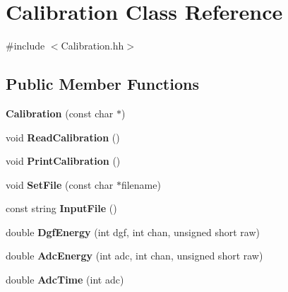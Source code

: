 \hypertarget{class_calibration}{}\section{Calibration Class Reference}
\label{class_calibration}


{\ttfamily \#include $<$Calibration.\+hh$>$}

\subsection*{Public Member Functions}
\begin{DoxyCompactItemize}
\item 
\mbox{\label{class_calibration_a981f7a519754aecbdd3fbd837a5b5762}} 
{\bfseries Calibration} (const char $\ast$)
\item 
\mbox{\label{class_calibration_ad675a1c74ecd23e3af37fcffdeeed246}} 
void {\bfseries Read\+Calibration} ()
\item 
\mbox{\label{class_calibration_af224d188d64080db8d14eb0ddbb909f7}} 
void {\bfseries Print\+Calibration} ()
\item 
\mbox{\label{class_calibration_aec8340a8b2134c9cb51b685c928c4cee}} 
void {\bfseries Set\+File} (const char $\ast$filename)
\item 
\mbox{\label{class_calibration_a10affa676c2fb505d3075d23c3bf0157}} 
const string {\bfseries Input\+File} ()
\item 
\mbox{\label{class_calibration_a0ea90a9b417ec5e50312b4bba2875f70}} 
double {\bfseries Dgf\+Energy} (int dgf, int chan, unsigned short raw)
\item 
\mbox{\label{class_calibration_a07ba44fdc31250e347939588759d2796}} 
double {\bfseries Adc\+Energy} (int adc, int chan, unsigned short raw)
\item 
\mbox{\label{class_calibration_a860b3c2c4a2350009bbbf337aa56a212}} 
double {\bfseries Adc\+Time} (int adc)
\item 
\mbox{\label{class_calibration_a65ab7c201643a2bc8cb366b9ac20ab3b}} 

\end{DoxyCompactItemize}
